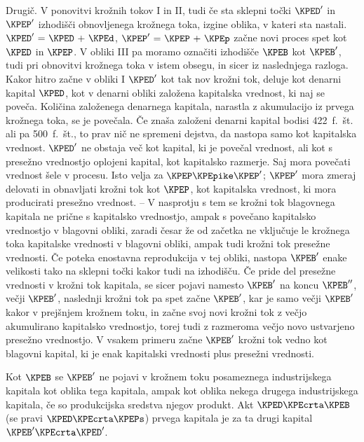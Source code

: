 \documentclass[kapital_02.tex]{subfiles}
\begin{document}
Drugič. \KPEstran V ponovitvi krožnih tokov I in II, tudi če sta sklepni točki \( \KPED' \) in \( \KPEP' \) izhodišči obnovljenega krožnega toka, izgine oblika, v kateri sta nastali. \( \KPED' \textrm{ = } \KPED \textrm{ + } \KPEd \), \( \KPEP' \textrm{ = } \KPEP \textrm{ + } \KPEp \) začne novi proces spet kot \( \KPED \) in \( \KPEP \). V obliki III pa moramo označiti izhodišče \( \KPEB \) kot \( \KPEB' \), tudi pri obnovitvi krožnega toka v istem obsegu, in sicer iz naslednjega razloga. Kakor hitro začne v obliki I \( \KPED' \) kot tak nov krožni tok, deluje kot denarni kapital \( \KPED \), kot v denarni obliki založena kapitalska vrednost, ki naj se poveča. Količina založenega denarnega kapitala, narastla z akumulacijo iz prvega krožnega toka, se je povečala. Če znaša založeni denarni kapital bodisi 422~f.~št. ali pa 500~f.~št., to prav nič ne spremeni dejstva, da nastopa samo kot kapitalska vrednost. \( \KPED' \) ne obstaja več kot kapital, ki je povečal vrednost, ali kot s presežno vrednostjo oplojeni kapital, kot kapitalsko razmerje. Saj mora povečati vrednost šele v procesu. Isto velja za \( \KPEP \KPEpike \KPEP' \); \( \KPEP' \) mora zmeraj delovati in obnavljati krožni tok kot \( \KPEP \), kot kapitalska vrednost, ki mora producirati presežno vrednost. -- V nasprotju s tem se krožni tok blagovnega kapitala ne prične s kapitalsko vrednostjo, ampak s povečano kapitalsko vrednostjo v blagovni obliki, zaradi česar že od začetka ne vključuje le krožnega toka kapitalske vrednosti v blagovni obliki, ampak tudi krožni tok presežne vrednosti. Če poteka enostavna reprodukcija v tej obliki, nastopa \( \KPEB' \) enake velikosti tako na sklepni točki kakor tudi na izhodišču. Če pride del presežne vrednosti v krožni tok kapitala, se sicer pojavi namesto \( \KPEB' \) na koncu \( \KPEB'' \), večji \( \KPEB' \), naslednji krožni tok pa spet začne \( \KPEB' \), kar je samo večji \( \KPEB' \) kakor v prejšnjem krožnem toku, in začne svoj novi krožni tok z večjo akumulirano kapitalsko vrednostjo, torej tudi z razmeroma večjo novo ustvarjeno presežno vrednostjo. V vsakem primeru začne \( \KPEB' \) krožni tok vedno kot blagovni kapital, ki je enak kapitalski vrednosti plus presežni vrednosti.

Kot \( \KPEB \) se \( \KPEB' \) ne pojavi v krožnem toku posameznega industrijskega kapitala kot oblika tega kapitala, ampak kot oblika nekega drugega industrijskega kapitala, če so produkcijska \KPEstran sredstva njegov produkt. Akt \( \KPED \KPEcrta \KPEB \) (se pravi \( \KPED \KPEcrta \KPEPs \)) prvega kapitala je za ta drugi kapital \( \KPEB' \KPEcrta \KPED' \).
\end{document}
